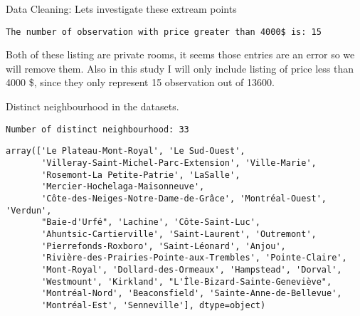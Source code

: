 \documentclass[
  ignorenonframetext,
]{beamer}
\begin{document}
\begin{frame}[fragile]{Data Cleaning:}
Lets investigate these extream points

\begin{verbatim}
The number of observation with price greater than 4000$ is: 15
\end{verbatim}

Both of these listing are private rooms, it seems those entries are an
error so we will remove them. Also in this study I will only include
listing of price less than 4000 \$, since they only represent 15
observation out of 13600.

Distinct neighbourhood in the datasets.

\begin{verbatim}
Number of distinct neighbourhood: 33
\end{verbatim}

\begin{verbatim}
array(['Le Plateau-Mont-Royal', 'Le Sud-Ouest',
       'Villeray-Saint-Michel-Parc-Extension', 'Ville-Marie',
       'Rosemont-La Petite-Patrie', 'LaSalle',
       'Mercier-Hochelaga-Maisonneuve',
       'Côte-des-Neiges-Notre-Dame-de-Grâce', 'Montréal-Ouest', 'Verdun',
       "Baie-d'Urfé", 'Lachine', 'Côte-Saint-Luc',
       'Ahuntsic-Cartierville', 'Saint-Laurent', 'Outremont',
       'Pierrefonds-Roxboro', 'Saint-Léonard', 'Anjou',
       'Rivière-des-Prairies-Pointe-aux-Trembles', 'Pointe-Claire',
       'Mont-Royal', 'Dollard-des-Ormeaux', 'Hampstead', 'Dorval',
       'Westmount', 'Kirkland', "L'Île-Bizard-Sainte-Geneviève",
       'Montréal-Nord', 'Beaconsfield', 'Sainte-Anne-de-Bellevue',
       'Montréal-Est', 'Senneville'], dtype=object)
\end{verbatim}
\end{frame}
\end{document}
